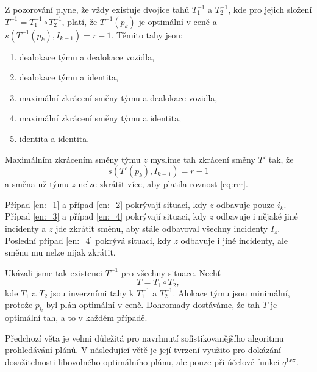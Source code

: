 \begin{dukaz}
  Z pozorování plyne, že vždy existuje dvojice tahů $T_1^{-1}$ a $T_2^{-1}$, kde pro jejich složení $T^{-1} = T_1^{-1} \circ T_2^{-1}$,
  platí, že $T^{-1}(p_k)$ je optimální v ceně a $s(T^{-1}(p_k), I_{k-1}) = r - 1$.
  Těmito tahy jsou:
  \begin{enumerate}
  \item
    dealokace týmu a dealokace vozidla, \label{en:_1}
  \item
    dealokace týmu a identita, \label{en:_2}
  \item
    maximální zkrácení směny týmu a dealokace vozidla, \label{en:_3}
  \item
    maximální zkrácení směny týmu a identita, \label{en:_4}
  \item
    identita a identita. \label{en:_5}
  \end{enumerate}
  Maximálním zkrácením směny týmu $z$ myslíme tah zkrácení směny $T'$ tak, že
  \begin{equation}\label{eq:rrr}
    s(T'(p_k), I_{k-1}) = r - 1
  \end{equation}
  a směna už týmu $z$ nelze zkrátit více, aby platila rovnost \ref{eq:rrr}.

  Případ \ref{en:_1} a případ \ref{en:_2} pokrývají situaci, kdy $z$ odbavuje pouze $i_k$.
  Případ \ref{en:_3} a případ \ref{en:_4} pokrývají situaci, kdy $z$ odbavuje i nějaké jiné incidenty a $z$ jde zkrátit směnu, aby stále odbavoval všechny incidenty $I_z$.
  Poslední případ \ref{en:_4} pokrývá situaci, kdy $z$ odbavuje i jiné incidenty, ale směnu mu nelze nijak zkrátit.

  Ukázali jsme tak existenci $T^{-1}$ pro všechny situace. Nechť
  \begin{equation*}
    T = T_1 \circ T_2,
  \end{equation*}
  kde $T_1$ a $T_2$ jsou inverzními tahy k $T_1^{-1}$ a $T_2^{-1}$.
  Alokace týmu jsou minimální, protože $p_k$ byl plán optimální v ceně.
  Dohromady dostáváme, že tah $T$ je optimální tah, a to v každém případě.
\end{dukaz}

Předchozí věta je velmi důležitá pro navrhnutí sofistikovanějšího algoritmu prohledávání plánů.
V následující větě je její tvrzení využito pro dokázání dosažitelnosti libovolného optimálního plánu, ale pouze při účelové funkci $q^{\text{Lex}}$.

